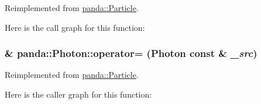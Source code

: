 Reimplemented from \hyperlink{classpanda_1_1Particle_aa30d821beea5e8f3d83580baf162a014}{panda::Particle}.

Here is the call graph for this function:\hypertarget{classpanda_1_1Photon_aa747baa897eca18a06d897063402a966}{
\subsubsection[{operator=}]{ \& panda::Photon::operator= ({\bf Photon} const \& {\em \_\-src})}}
\label{classpanda_1_1Photon_aa747baa897eca18a06d897063402a966}


Reimplemented from \hyperlink{classpanda_1_1Particle_a8c4fabfceb39b746b0e68a7389e662c4}{panda::Particle}.

Here is the caller graph for this function:

